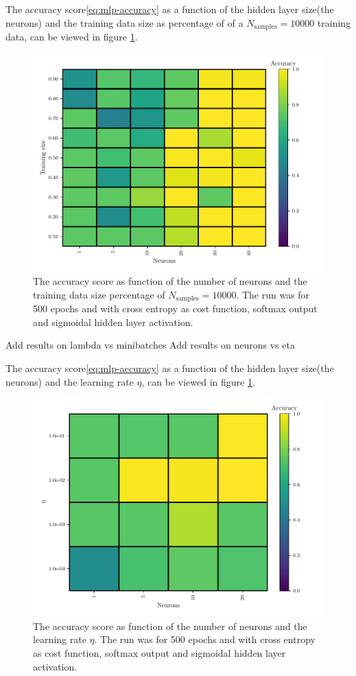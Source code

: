 The accuracy score\eqref{eq:mlp-accuracy} as a function of the hidden layer size(the neurons) and the training data size as percentage of of a $N_\mathrm{samples}=10000$ training data, can be viewed in figure \ref{fig:mlp-neurons-ts}.
\begin{figure}[H]
    \centering
    \includegraphics[scale=1.0]{../fig/mlp_neurons_training_size.pdf}
    \caption{The accuracy score as function of the number of neurons and the training data size percentage of $N_\mathrm{samples}=10000$. The run was for 500 epochs and with cross entropy as cost function, softmax output and sigmoidal hidden layer activation.}
    \label{fig:mlp-neurons-ts}
\end{figure}

Add results on lambda vs minibatches
Add results on neurons vs eta

The accuracy score\eqref{eq:mlp-accuracy} as a function of the hidden layer size(the neurons) and the learning rate $\eta$, can be viewed in figure \ref{fig:mlp-neurons-ts}.
\begin{figure}[H]
    \centering
    \includegraphics[scale=1.0]{../fig/mlp_neurons_eta.pdf}
    \caption{The accuracy score as function of the number of neurons and the learning rate $\eta$. The run was for 500 epochs and with cross entropy as cost function, softmax output and sigmoidal hidden layer activation.}
    \label{fig:mlp-neurons-eta}
\end{figure}
